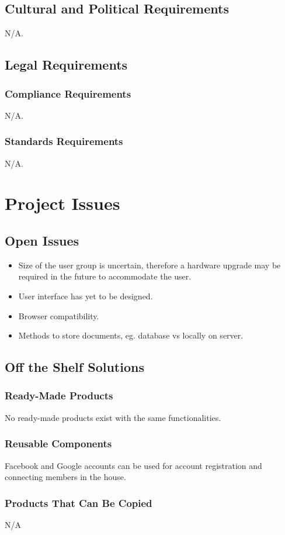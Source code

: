 \documentclass[12pt]{article}
\begin{document}
{\subsection{Cultural and Political Requirements}
N/A.
\subsection{Legal Requirements}
\subsubsection{Compliance Requirements}
N/A.
\subsubsection{Standards Requirements}
N/A.

\section{Project Issues}
\subsection{Open Issues}
\begin{itemize}
  \item Size of the user group is uncertain, therefore a hardware upgrade may be 
required in the future to accommodate the user.
  \item User interface has yet to be designed.
  \item Browser compatibility.
  \item Methods to store documents, eg. database vs locally on server.
\end{itemize}

\subsection{Off the Shelf Solutions}
\subsubsection{Ready-Made Products}
No ready-made products exist with the same functionalities. 
\subsubsection{Reusable Components}
Facebook and Google accounts can be used for account registration and connecting members in 
the house.
\subsubsection{Products That Can Be Copied}
N/A
}
\end{document}
